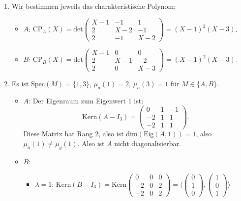 \begin{enumerate}
	\item Wir bestimmen jeweils das charakteristische Polynom:
	\begin{itemize}
	 	\item \( A \): \( \text{CP}_A(X) = \text{det}\begin{pmatrix}
	 		X-1 & -1 & 1 \\
	 		2 & X-2 & -1 \\
	 		2 & -1 & X-2
	 	\end{pmatrix} = (X-1)^2(X-3) \). 

	 	\item \( B \): \( \text{CP}_B(X) = \text{det}\begin{pmatrix}
	 		X-1 & 0 & 0 \\
	 		2 & X-1 & -2 \\
	 		2 & 0 & X-3
	 	\end{pmatrix} = (X-1)^2(X-3) \).
	 \end{itemize} 

	 \item Es ist \( \text{Spec}(M) = \{ 1, 3 \} \), \( \mu_a(1) = 2 \), \( \mu_a(3) = 1 \) für \( M \in \{ A, B \} \).
	 \begin{itemize}
	 	\item \( A \): Der Eigenraum zum Eigenwert \( 1 \) ist:
	 	\begin{equation*}
	 	 	\text{Kern}(A-I_3) = \begin{pmatrix}
	 	 		0 & 1 & -1 \\
	 	 		-2 & 1 & 1 \\
	 	 		-2 & 1 & 1
	 	 	\end{pmatrix}\text{.}
	 	 \end{equation*}
	 	 Diese Matrix hat Rang \( 2 \), also ist \( \text{dim}(\text{Eig}(A, 1)) = 1 \), also \( \mu_a(1) \neq \mu_g(1) \). Also ist \( A \) nicht diagonalisierbar.

	 	 \item \( B \):
	 	 \begin{itemize}
	 	  	\item \( \lambda = 1 \): \( \text{Kern}(B - I_3) = \text{Kern}\begin{pmatrix}
	 	  		0 & 0 & 0 \\
	 	  		-2 & 0 & 2 \\
	 	  		-2 & 0 & 2
	 	  	\end{pmatrix} = \langle \begin{pmatrix}
	 	  		0 \\ 1 \\ 0
	 	  	\end{pmatrix}, \begin{pmatrix}
	 	  		1 \\ 0 \\ 1
	 	  	\end{pmatrix} \rangle \) 


\end{itemize}
\end{itemize}
\end{enumerate}
